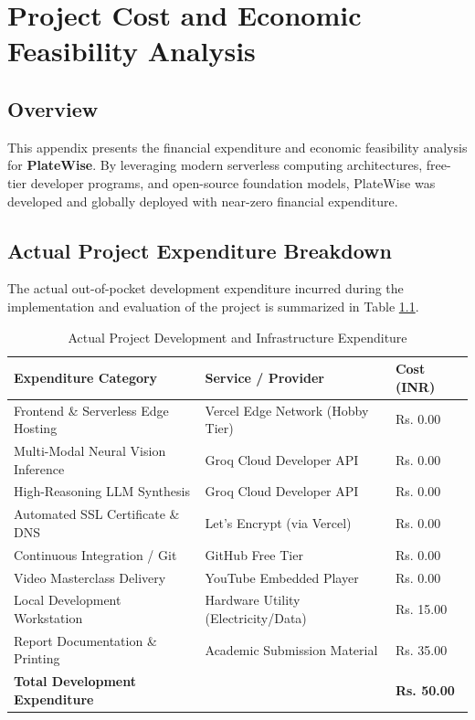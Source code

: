 \chapter{Project Cost and Economic Feasibility Analysis}

\section{Overview}
This appendix presents the financial expenditure and economic feasibility analysis for \textbf{PlateWise}. By leveraging modern serverless computing architectures, free-tier developer programs, and open-source foundation models, PlateWise was developed and globally deployed with near-zero financial expenditure.

\section{Actual Project Expenditure Breakdown}
The actual out-of-pocket development expenditure incurred during the implementation and evaluation of the project is summarized in Table \ref{tab:actual_cost}.

\begin{table}[H]
\centering
\caption{Actual Project Development and Infrastructure Expenditure}
\label{tab:actual_cost}
\begin{tabular}{|p{5.5cm}|p{4.5cm}|p{3.0cm}|}
\hline
\textbf{Expenditure Category} & \textbf{Service / Provider} & \textbf{Cost (INR)} \\ \hline
Frontend \& Serverless Edge Hosting & Vercel Edge Network (Hobby Tier) & Rs. 0.00 \\ \hline
Multi-Modal Neural Vision Inference & Groq Cloud Developer API & Rs. 0.00 \\ \hline
High-Reasoning LLM Synthesis & Groq Cloud Developer API & Rs. 0.00 \\ \hline
Automated SSL Certificate \& DNS & Let's Encrypt (via Vercel) & Rs. 0.00 \\ \hline
Continuous Integration / Git & GitHub Free Tier & Rs. 0.00 \\ \hline
Video Masterclass Delivery & YouTube Embedded Player & Rs. 0.00 \\ \hline
Local Development Workstation & Hardware Utility (Electricity/Data) & Rs. 15.00 \\ \hline
Report Documentation \& Printing & Academic Submission Material & Rs. 35.00 \\ \hline
\textbf{Total Development Expenditure} & & \textbf{Rs. 50.00} \\ \hline
\end{tabular}
\end{table}

